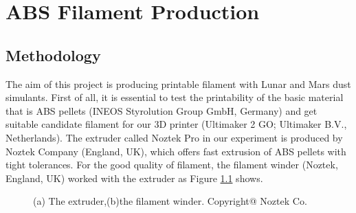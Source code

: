 \chapter{ABS Filament Production}
\renewcommand{\baselinestretch}{\mystretch}
\label{chap:ABS}

\section{Methodology}
The aim of this project is producing printable filament with Lunar and Mars dust simulants. First of all, it is essential to test the printability of the basic material that is ABS pellets (INEOS Styrolution Group GmbH, Germany) and get suitable candidate filament for our 3D printer (Ultimaker 2 GO; Ultimaker B.V., Netherlands). The extruder called Noztek Pro in our experiment is produced by Noztek Company (England, UK), which offers fast extrusion of ABS pellets with tight tolerances. For the good quality of filament, the filament winder (Noztek, England, UK) worked with the extruder as Figure \ref{Fig:extruder and winder} shows.

\begin{figure}[htbp] %
	\centering
  \caption[The machines for filament manufacuring]{\footnotesize (a) The extruder,(b)the filament winder. Copyright@ Noztek Co. }
  \label{Fig:extruder and winder}
\end{figure}

